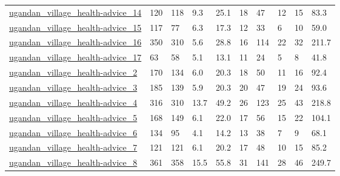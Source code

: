 \begin{longtable}{llllllllll}
 \href{https://www.repository.cam.ac.uk/handle/1810/270256?show=full}{ugandan\_village\_health-advice\_14}                     & 120        & 118   & 9.3    & 25.1   & 18    & 47     & 12     & 15     & 83.3    \\
 \href{https://www.repository.cam.ac.uk/handle/1810/270256?show=full}{ugandan\_village\_health-advice\_15}                     & 117        & 77    & 6.3    & 17.3   & 12    & 33     & 6      & 10     & 59.0    \\
 \href{https://www.repository.cam.ac.uk/handle/1810/270256?show=full}{ugandan\_village\_health-advice\_16}                     & 350        & 310   & 5.6    & 28.8   & 16    & 114    & 22     & 32     & 211.7   \\
 \href{https://www.repository.cam.ac.uk/handle/1810/270256?show=full}{ugandan\_village\_health-advice\_17}                     & 63         & 58    & 5.1    & 13.1   & 11    & 24     & 5      & 8      & 41.8    \\
 \href{https://www.repository.cam.ac.uk/handle/1810/270256?show=full}{ugandan\_village\_health-advice\_2}                      & 170        & 134   & 6.0    & 20.3   & 18    & 50     & 11     & 16     & 92.4    \\
 \href{https://www.repository.cam.ac.uk/handle/1810/270256?show=full}{ugandan\_village\_health-advice\_3}                      & 185        & 139   & 5.9    & 20.3   & 20    & 47     & 19     & 24     & 93.6    \\
 \href{https://www.repository.cam.ac.uk/handle/1810/270256?show=full}{ugandan\_village\_health-advice\_4}                      & 316        & 310   & 13.7   & 49.2   & 26    & 123    & 25     & 43     & 218.8   \\
 \href{https://www.repository.cam.ac.uk/handle/1810/270256?show=full}{ugandan\_village\_health-advice\_5}                      & 168        & 149   & 6.1    & 22.0   & 17    & 56     & 15     & 22     & 104.1   \\
 \href{https://www.repository.cam.ac.uk/handle/1810/270256?show=full}{ugandan\_village\_health-advice\_6}                      & 134        & 95    & 4.1    & 14.2   & 13    & 38     & 7      & 9      & 68.1    \\
 \href{https://www.repository.cam.ac.uk/handle/1810/270256?show=full}{ugandan\_village\_health-advice\_7}                      & 121        & 121   & 6.1    & 20.2   & 17    & 48     & 10     & 15     & 85.2    \\
 \href{https://www.repository.cam.ac.uk/handle/1810/270256?show=full}{ugandan\_village\_health-advice\_8}                      & 361        & 358   & 15.5   & 55.8   & 31    & 141    & 28     & 46     & 249.7   \\

\end{longtable}
